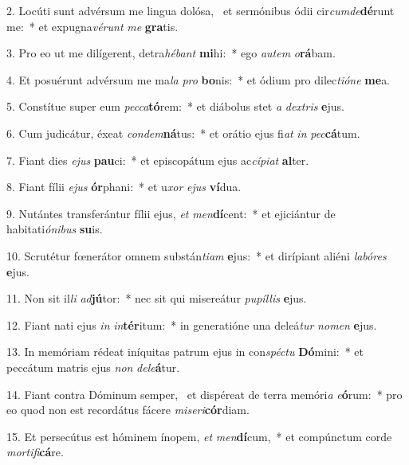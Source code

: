 2. Locúti sunt advérsum me lingua dolósa, \dag\  et sermónibus ódii cir\textit{cum}\textit{de}\textbf{dé}runt me:~*  et expugna\textit{vé}\textit{runt} \textit{me} \textbf{gra}tis.\

3. Pro eo ut me dilígerent, detra\textit{hé}\textit{bant} \textbf{mi}hi:~*  ego \textit{au}\textit{tem} \textit{o}\textbf{rá}bam.\

4. Et posuérunt advérsum me ma\textit{la} \textit{pro} \textbf{bo}nis:~*  et ódium pro dilec\textit{ti}\textit{ó}\textit{ne} \textbf{me}a.\

5. Constítue super eum \textit{pec}\textit{ca}\textbf{tó}rem:~*  et diábolus stet \textit{a} \textit{dex}\textit{tris} \textbf{e}jus.\

6. Cum judicátur, éxeat \textit{con}\textit{dem}\textbf{ná}tus:~*  et orátio ejus fi\textit{at} \textit{in} \textit{pec}\textbf{cá}tum.\

7. Fiant dies \textit{e}\textit{jus} \textbf{pau}ci:~*  et episcopátum ejus ac\textit{cí}\textit{pi}\textit{at} \textbf{al}ter.\

8. Fiant fílii \textit{e}\textit{jus} \textbf{ór}phani:~*  et u\textit{xor} \textit{e}\textit{jus} \textbf{ví}dua.\

9. Nutántes transferántur fílii ejus, \textit{et} \textit{men}\textbf{dí}cent:~*  et ejiciántur de habitati\textit{ó}\textit{ni}\textit{bus} \textbf{su}is.\

10. Scrutétur fœnerátor omnem substán\textit{ti}\textit{am} \textbf{e}jus:~*  et dirípiant aliéni \textit{la}\textit{bó}\textit{res} \textbf{e}jus.\

11. Non sit il\textit{li} \textit{ad}\textbf{jú}tor:~*  nec sit qui misereátur \textit{pu}\textit{píl}\textit{lis} \textbf{e}jus.\

12. Fiant nati ejus \textit{in} \textit{in}\textbf{tér}itum:~*  in generatióne una deleá\textit{tur} \textit{no}\textit{men} \textbf{e}jus.\

13. In memóriam rédeat iníquitas patrum ejus in con\textit{spéc}\textit{tu} \textbf{Dó}mini:~*  et peccátum matris ejus \textit{non} \textit{de}\textit{le}\textbf{á}tur.\

14. Fiant contra Dóminum semper, \dag\  et dispéreat de terra memóri\textit{a} \textit{e}\textbf{ó}rum:~*  pro eo quod non est recordátus fácere \textit{mi}\textit{se}\textit{ri}\textbf{cór}diam.\

15. Et persecútus est hóminem ínopem, \textit{et} \textit{men}\textbf{dí}cum,~*  et compúnctum corde \textit{mor}\textit{ti}\textit{fi}\textbf{cá}re.\

